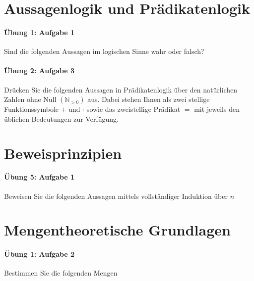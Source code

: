 \documentclass
[
  draft    = true,
  fontsize = 11pt,
  parskip  = half-,
  BCOR     = 0pt,
  DIV      = 11,
  ngerman,
  dvipsnames
]
{scrartcl}
\begin{document}

\tableofcontents

\section{Aussagenlogik und Prädikatenlogik}

\paragraph{Übung 1: Aufgabe 1}
Sind die folgenden Aussagen im logischen Sinne wahr oder falsch?

\paragraph{Übung 2: Aufgabe 3}
Drücken Sie die folgenden Aussagen in Prädikatenlogik über den natürlichen
Zahlen ohne Null $(\mathbb{N}_{>0})$ aus. Dabei stehen Ihnen als zwei stellige
Funktionssymbole $+$ und $\cdot$ sowie das zweistellige Prädikat $=$ mit jeweils
den üblichen Bedeutungen zur Verfügung.

\section{Beweisprinzipien}

\paragraph{Übung 5: Aufgabe 1}
Beweisen Sie die folgenden Aussagen mittels vollständiger Induktion über
$n$

\section{Mengentheoretische Grundlagen}

\paragraph{Übung 1: Aufgabe 2}
Bestimmen Sie die folgenden Mengen
\end{document}
